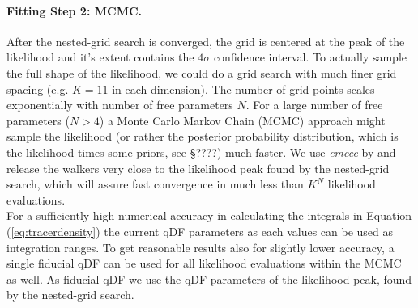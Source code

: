 \paragraph{Fitting Step 2: MCMC.} After the nested-grid search is converged, the grid is centered at the peak of the likelihood and it's extent contains the $4\sigma$ confidence interval. To actually sample the full shape of the likelihood, we could do a grid search with much finer grid spacing (e.g. $K=11$ in each dimension). The number of grid points scales exponentially with number of free parameters $N$. For a large number of free parameters ($N>4$) a Monte Carlo Markov Chain (MCMC) approach might sample the likelihood (or rather the posterior probability distribution, which is the likelihood times some priors, see \S ????) much faster. We use \emph{emcee} by \citet{for13} and release the walkers very close to the likelihood peak found by the nested-grid search, which will assure fast convergence in much less than $K^N$ likelihood evaluations.
\\For a sufficiently high numerical accuracy in calculating the integrals in Equation (\ref{eq:tracerdensity}) the current qDF parameters as each values can be used as integration ranges. To get reasonable results also for slightly lower accuracy, a single fiducial qDF can be used for all likelihood evaluations within the MCMC as well. As fiducial qDF we use the qDF parameters of the likelihood peak, found by the nested-grid search.
